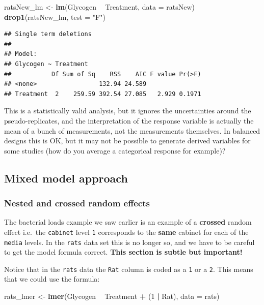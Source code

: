 \documentclass[]{book}
\newenvironment{Shaded}{\begin{snugshade}}{\end{snugshade}}
\newcommand{\KeywordTok}[1]{\textcolor[rgb]{0.13,0.29,0.53}{\textbf{#1}}}
\newcommand{\DataTypeTok}[1]{\textcolor[rgb]{0.13,0.29,0.53}{#1}}
\newcommand{\DecValTok}[1]{\textcolor[rgb]{0.00,0.00,0.81}{#1}}
\newcommand{\StringTok}[1]{\textcolor[rgb]{0.31,0.60,0.02}{#1}}
\newcommand{\OperatorTok}[1]{\textcolor[rgb]{0.81,0.36,0.00}{\textbf{#1}}}
\newcommand{\NormalTok}[1]{#1}
\theoremstyle{definition}
\theoremstyle{definition}
\theoremstyle{definition}
\theoremstyle{remark}
\begin{document}
\begin{Shaded}
\begin{Highlighting}[]
\NormalTok{ratsNew_lm <-}\StringTok{ }\KeywordTok{lm}\NormalTok{(Glycogen }\OperatorTok{~}\StringTok{ }\NormalTok{Treatment, }\DataTypeTok{data =}\NormalTok{ ratsNew)}
\KeywordTok{drop1}\NormalTok{(ratsNew_lm, }\DataTypeTok{test =} \StringTok{"F"}\NormalTok{)}
\end{Highlighting}
\end{Shaded}

\begin{verbatim}
## Single term deletions
## 
## Model:
## Glycogen ~ Treatment
##           Df Sum of Sq    RSS    AIC F value Pr(>F)
## <none>                 132.94 24.589               
## Treatment  2    259.59 392.54 27.085   2.929 0.1971
\end{verbatim}

This is a statistically valid analysis, but it ignores the uncertainties
around the pseudo-replicates, and the interpretation of the response
variable is actually the mean of a bunch of measurements, not the
measurements themselves. In balanced designs this is OK, but it may not
be possible to generate derived variables for some studies (how do you
average a categorical response for example)?

\hypertarget{secmixed}{\subsection{Mixed model
approach}\label{secmixed}}

\subsubsection{Nested and crossed random
effects}\label{nested-and-crossed-random-effects}

The bacterial loads example we saw earlier is an example of a
\textbf{crossed} random effect i.e.~the \texttt{cabinet} level
\texttt{1} corresponds to the \textbf{same} cabinet for each of the
\texttt{media} levels. In the \texttt{rats} data set this is no longer
so, and we have to be careful to get the model formula correct.
\textbf{This section is subtle but important!}

Notice that in the \texttt{rats} data the \texttt{Rat} column is coded
as a \texttt{1} or a \texttt{2}. This means that we could use the
formula:

\begin{Shaded}
\begin{Highlighting}[]
\NormalTok{rats_lmer <-}\StringTok{ }\KeywordTok{lmer}\NormalTok{(Glycogen }\OperatorTok{~}\StringTok{ }\NormalTok{Treatment }\OperatorTok{+}\StringTok{ }\NormalTok{(}\DecValTok{1} \OperatorTok{|}\StringTok{ }\NormalTok{Rat), }\DataTypeTok{data =}\NormalTok{ rats)}
\end{Highlighting}
\end{Shaded}
\end{document}

